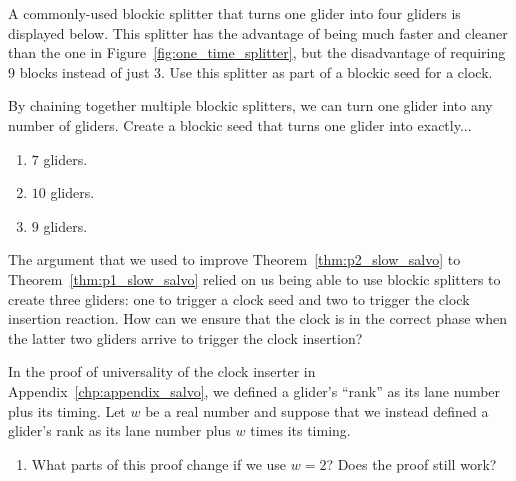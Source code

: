 \begin{multicols}{2}
	
	\begin{problem}\label{exer:new_splitter}
		A commonly-used blockic splitter that turns one glider into four gliders is displayed below. This splitter has the advantage of being much faster and cleaner than the one in Figure~\ref{fig:one_time_splitter}, but the disadvantage of requiring 9 blocks instead of just 3. Use this splitter as part of a blockic seed for a clock.
		\begin{center}
		\end{center}
	\end{problem}
	
	
	\mfilbreak
	
	
	\begin{problem}\label{exer:blockic_splitter_chain}
		By chaining together multiple blockic splitters, we can turn one glider into any number of gliders. Create a blockic seed that turns one glider into exactly...
		\begin{enumerate}[label=\bf\color{ocre}(\alph*)]
			\item $7$ gliders.
			
			\item $10$ gliders.
			
			\item $9$ gliders.
		\end{enumerate}
	\end{problem}
	
	
	\mfilbreak
	
	
	\begin{problemstar}\label{exer:p2_salvo_reduce_to_p1}
		The argument that we used to improve Theorem~\ref{thm:p2_slow_salvo} to Theorem~\ref{thm:p1_slow_salvo} relied on us being able to use blockic splitters to create three gliders: one to trigger a clock seed and two to trigger the clock insertion reaction. How can we ensure that the clock is in the correct phase when the latter two gliders arrive to trigger the clock insertion?
	\end{problemstar}
	
	
	\mfilbreak
	
	
	\begin{problemstar}\label{exer:slow_salvo_clock_slope}
		In the proof of universality of the clock inserter in Appendix~\ref{chp:appendix_salvo}, we defined a glider's ``rank'' as its lane number plus its timing. Let $w$ be a real number and suppose that we instead defined a glider's rank as its lane number plus $w$ times its timing.
		\begin{enumerate}[label=\bf\color{ocre}(\alph*)]
			\item What parts of this proof change if we use $w = 2$? Does the proof still work?
			

\end{enumerate}
\end{problemstar}
\end{multicols}
